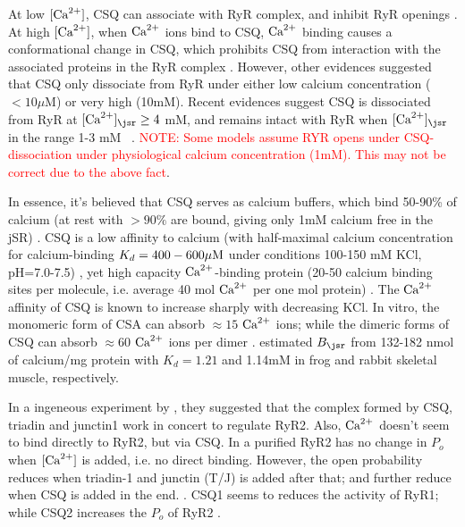 At low $[{\text{Ca}^{2+}}]$, CSQ can associate with RyR complex, and inhibit RyR openings
\citep{ikemoto1989prc}. At high $[{\text{Ca}^{2+}}]$, when ${\text{Ca}^{2+}}$ ions bind to CSQ, ${\text{Ca}^{2+}}$
binding causes a conformational change in CSQ, which prohibits CSQ from
interaction with the associated proteins in the RyR complex \citep{mitchell1988,
Gyorke2004, Gyorke2004a}. However, other evidences suggested that CSQ only
dissociate from RyR under either low calcium concentration ($< 10\mu$M) or very
high (10mM). Recent evidences suggest CSQ is dissociated from RyR at $[\Ca]_\jsr
\ge 4$ mM, and remains intact with RyR when $[\Ca]_\jsr$ in the range 1-3 mM
~\citep{Beard2005}. \textcolor{red}{NOTE:
Some models assume RYR opens under CSQ-dissociation under physiological calcium
concentration (1mM). This may not be correct due to the above fact}.

In essence, it's believed that CSQ serves as calcium buffers, which bind 50-90\%
of calcium (at rest with $>90\%$ are bound, giving only 1mM calcium free in the
jSR) \citep{ikemoto1989prc}. CSQ is a low affinity to calcium (with half-maximal
calcium concentration for calcium-binding $K_d = 400-600{\mu\text{M}}$ under conditions
100-150 mM KCl, pH=7.0-7.5) \citep{mitchell1988, slupsky1987}, yet high capacity
${\text{Ca}^{2+}}$-binding protein (20-50 calcium binding sites per molecule, i.e. average 40
mol ${\text{Ca}^{2+}}$ per one mol protein) \citep{MacLennan1971}. The ${\text{Ca}^{2+}}$ affinity of CSQ
is known to increase sharply with decreasing KCl. In vitro, the monomeric form
of CSA can absorb $\approx 15$ ${\text{Ca}^{2+}}$ ions; while the dimeric forms of CSQ can
absorb $\approx 60$ ${\text{Ca}^{2+}}$ ions per dimer \citep{park2004}. \citep{Donoso1995}
estimated $B_\jsr$ from 132-182 nmol of calcium/mg protein with $K_d = 1.21$ and
1.14mM in frog and rabbit skeletal muscle, respectively.


In a ingeneous experiment by \citep{Gyoerke2004}, they suggested that the
complex formed by CSQ, triadin and junctin1 work in concert to regulate RyR2.
Also, ${\text{Ca}^{2+}}$ doesn't seem to bind directly to RyR2, but via CSQ. In a purified
RyR2 has no change in $P_o$ when $[{\text{Ca}^{2+}}]$ is added, i.e. no direct binding.
However, the open probability reduces when triadin-1 and junctin (T/J) is added
after that; and further reduce when CSQ is added in the end. . CSQ1 seems to
reduces the activity of RyR1; while CSQ2 increases the $P_o$ of RyR2
\citep{wei2009uis}. 

